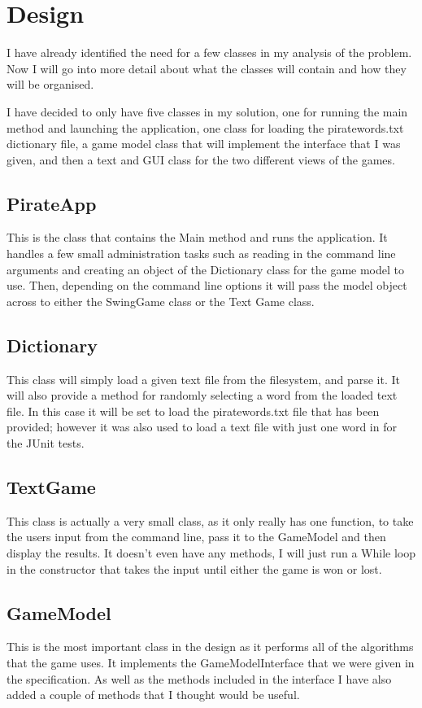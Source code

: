 \documentclass[notitlepage]{report}
\begin{document}
\section{Design}
I have already identified the need for a few classes in my analysis of the problem. Now I will go into more detail about what the classes will contain and how they will be organised. 

I have decided to only have five classes in my solution, one for running the main method and launching the application, one class for loading the piratewords.txt dictionary file, a game model class that will implement the interface that I was given, and then a text and GUI class for the two different views of the games. 

\subsection{PirateApp}
This is the class that contains the Main method and runs the application. It handles a few small administration tasks such as reading in the command line arguments and creating an object of the Dictionary class for the game model to use. Then, depending on the command line options it will pass the model object across to either the SwingGame class or the Text Game class. 


\subsection{Dictionary}
This class will simply load a given text file from the filesystem, and parse it. It will also provide a method for randomly selecting a word from the loaded text file. In this case it will be set to load the piratewords.txt file that has been provided; however it was also used to load a text file with just one word in for the JUnit tests. 

\subsection{TextGame}
This class is actually a very small class, as it only really has one function, to take the users input from the command line, pass it to the GameModel and then display the results. It doesn't even have any methods, I will just run a While loop in the constructor that takes the input until either the game is won or lost. 

\subsection{GameModel}
This is the most important class in the design as it performs all of the algorithms that the game uses. It implements the GameModelInterface that we were given in the specification. As well as the methods included in the interface I have also added a couple of methods that I thought would be useful. 
\end{document}
